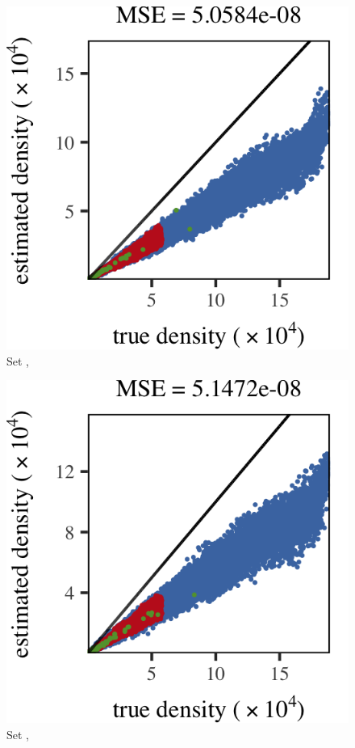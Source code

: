 
\begin{subfigure}{0.33\textwidth}
	\centering
	\includegraphics[keepaspectratio=true, width=\textwidth, height=0.185\textheight]{result/img/results_ferdosi_2_60000_mbe_silverman}
	\caption{Set \ferdosiTwo, \mbe}
	\label{fig:results:multisphere:mbe:ferdosi2}
\end{subfigure}
\begin{subfigure}{0.33\textwidth}
	\centering
	\includegraphics[keepaspectratio=true, width=\textwidth, height=0.185\textheight]{result/img/results_baakman_2_60000_mbe_silverman}
	\caption{Set \baakmanTwo, \mbe}
	\label{fig:results:multisphere:mbe:baakman2}
\end{subfigure}
